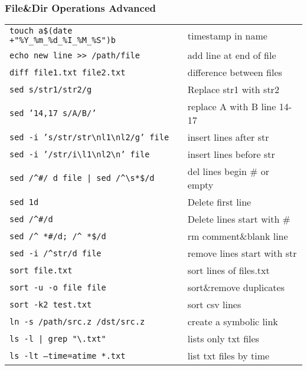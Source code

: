 \documentclass[fontsize=6pt,paper=a4,paper=landscape,twoside=false,parskip=half,
headings=small,numbers=withenddot,usegeometry=true,english]{scrartcl}
\begin{document}
\begin{multicols}{4}
{	\subsubsection{File\&Dir Operations Advanced}\label{sec:filediroperationsadvanced}
	\begin{tabular}{@{}ll@{}}\toprule
		\texttt{touch a\$(date +"\%Y\_\%m\_\%d\_\%I\_\%M\_\%S")b}  &  timestamp in name\\
		\texttt{echo \textquotesingle new line\textquotesingle{} >{}> /path/file}  &  add line at end of file\\
		\texttt{diff file1.txt file2.txt}  &  difference between files\\
		\texttt{sed \textquotesingle s/str1/str2/g\textquotesingle}  &  Replace str1 with str2\\
		\texttt{sed '14,17 s/A/B/'}  &  replace A with B line 14-17\\
		\texttt{sed -i 's/str/str\textbackslash nl1\textbackslash nl2/g' file}  &  insert lines after str\\
		\texttt{sed -i '/str/i\textbackslash l1\textbackslash nl2\textbackslash n' file}  &  insert lines before str\\
		\texttt{sed \textquotesingle/\^{}\#/ d\textquotesingle{} file | sed \textquotesingle/\^{}\textbackslash s*\$/d\textquotesingle}  &  del lines begin \# or empty\\
		\texttt{sed \textquotesingle 1d\textquotesingle}  &  Delete first line\\
		\texttt{sed \textquotesingle/\^{}\#/d\textquotesingle}  &  Delete lines start with \#\\
		\texttt{sed \textquotesingle /\^{} *\#/d; /\^{} *\$/d\textquotesingle}  &  rm comment\&blank line\\
		\texttt{sed -i \textquotesingle/\^{}str/d\textquotesingle{} file}  &  remove lines start with str\\
		\texttt{sort file.txt}  &  sort lines of files.txt\\
		\texttt{sort -u -o file file}  &  sort\&remove duplicates\\
		\texttt{sort -k2 test.txt}  &  sort csv lines\\
		\texttt{ln -s /path/src.z /dst/src.z}  &  create a symbolic link\\	
		\texttt{ls -l | grep "\textbackslash.txt"}  &  lists only txt files\\
		\texttt{ls -lt --time=atime *.txt}  &  list txt files by time\\

\end{tabular}}
\end{multicols}
\end{document}
